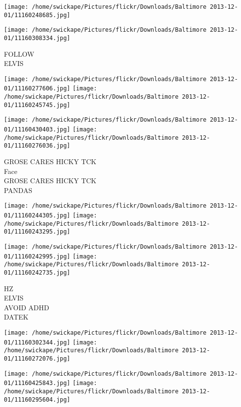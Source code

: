 \documentclass[10pt,letterpaper]{article}
\begin{document}
\texttt{[image: /home/swickape/Pictures/flickr/Downloads/Baltimore 2013-12-01/11160248685.jpg]}

\vspace{0.25in}
\texttt{[image: /home/swickape/Pictures/flickr/Downloads/Baltimore 2013-12-01/11160308334.jpg]}

FOLLOW\\
ELVIS\\
\pagebreak

\texttt{[image: /home/swickape/Pictures/flickr/Downloads/Baltimore 2013-12-01/11160277606.jpg]}
\texttt{[image: /home/swickape/Pictures/flickr/Downloads/Baltimore 2013-12-01/11160245745.jpg]}

\texttt{[image: /home/swickape/Pictures/flickr/Downloads/Baltimore 2013-12-01/11160430403.jpg]}
\texttt{[image: /home/swickape/Pictures/flickr/Downloads/Baltimore 2013-12-01/11160276036.jpg]}

GROSE CARES HICKY TCK\\
Face\\
GROSE CARES HICKY TCK\\
PANDAS\\
\pagebreak

\texttt{[image: /home/swickape/Pictures/flickr/Downloads/Baltimore 2013-12-01/11160244305.jpg]}
\texttt{[image: /home/swickape/Pictures/flickr/Downloads/Baltimore 2013-12-01/11160243295.jpg]}

\texttt{[image: /home/swickape/Pictures/flickr/Downloads/Baltimore 2013-12-01/11160242995.jpg]}
\texttt{[image: /home/swickape/Pictures/flickr/Downloads/Baltimore 2013-12-01/11160242735.jpg]}

HZ\\
ELVIS\\
AVOID ADHD\\
DATEK\\
\pagebreak

\texttt{[image: /home/swickape/Pictures/flickr/Downloads/Baltimore 2013-12-01/11160302344.jpg]}
\texttt{[image: /home/swickape/Pictures/flickr/Downloads/Baltimore 2013-12-01/11160272076.jpg]}

\texttt{[image: /home/swickape/Pictures/flickr/Downloads/Baltimore 2013-12-01/11160425843.jpg]}
\texttt{[image: /home/swickape/Pictures/flickr/Downloads/Baltimore 2013-12-01/11160295604.jpg]}
\end{document}
